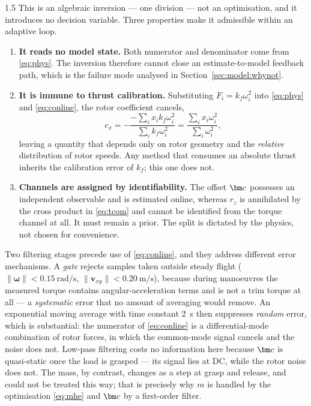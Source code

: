 \begin{spacing}{1.5}
This is an algebraic inversion --- one division --- not an optimisation,
and it introduces no decision variable. Three properties make it
admissible within an adaptive loop.

\begin{enumerate}
\item \textbf{It reads no model state.} Both numerator and denominator
come from \eqref{eq:phys}. The inversion therefore cannot close an
estimate-to-model feedback path, which is the failure mode analysed in
Section~\ref{sec:model:whynot}.

\item \textbf{It is immune to thrust calibration.} Substituting
$F_i = k_f \omega_i^2$ into \eqref{eq:phys} and \eqref{eq:conline}, the
rotor coefficient cancels,
\begin{equation}
c_x = -\frac{-\sum_i x_i k_f \omega_i^2}{\sum_i k_f \omega_i^2}
    = \frac{\sum_i x_i \omega_i^2}{\sum_i \omega_i^2},
\label{eq:kfcancel}
\end{equation}
leaving a quantity that depends only on rotor geometry and the
\emph{relative} distribution of rotor speeds. Any method that consumes an
absolute thrust inherits the calibration error of $k_f$; this one does
not.

\item \textbf{Channels are assigned by identifiability.} The offset
$\cvec$ possesses an independent observable and is estimated online,
whereas $r_z$ is annihilated by the cross product in \eqref{eq:tcom} and
cannot be identified from the torque channel at all. It must remain a
prior. The split is dictated by the physics, not chosen for convenience.
\end{enumerate}

Two filtering stages precede use of \eqref{eq:conline}, and they address
different error mechanisms. A \emph{gate} rejects samples taken outside
steady flight ($\|\bm{\omega}\| < \SI{0.15}{\radian\per\second}$,
$\|\bm{v}_{xy}\| < \SI{0.20}{\meter\per\second}$), because during
manoeuvres the measured torque contains angular-acceleration terms and is
not a trim torque at all --- a \emph{systematic} error that no amount of
averaging would remove. An exponential moving average with time constant
\SI{2}{\second} then suppresses \emph{random} error, which is
substantial: the numerator of \eqref{eq:conline} is a differential-mode
combination of rotor forces, in which the common-mode signal cancels and
the noise does not. Low-pass filtering costs no information here because
$\cvec$ is quasi-static once the load is grasped --- its signal lies at
DC, while the rotor noise does not. The mass, by contrast, changes as a
step at grasp and release, and could not be treated this way; that is
precisely why $m$ is handled by the optimisation \eqref{eq:mhe} and
$\cvec$ by a first-order filter.


\end{spacing}
